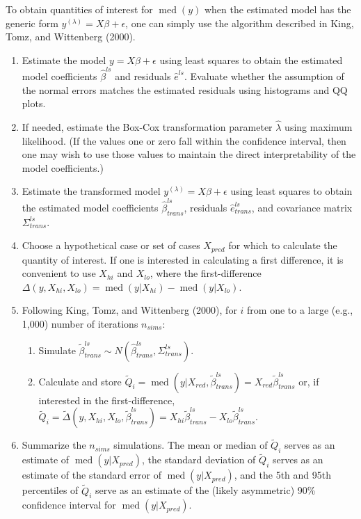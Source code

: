 \documentclass[10pt]{article}
\DeclareMathOperator{\med}{med}
\begin{document}
To obtain quantities of interest for $\med(y)$ when the estimated model has the generic form $y^{(\lambda)} = X\beta + \epsilon$, one can simply use the algorithm described in King, Tomz, and Wittenberg (2000).
\begin{enumerate}
\item Estimate the model $y = X\beta + \epsilon$ using least squares to obtain the estimated model coefficients $\hat{\beta}^{ls}$ and residuals $\hat{e}^{ls}$. Evaluate whether the assumption of the normal errors matches the estimated residuals using histograms and QQ plots.
\item If needed, estimate the Box-Cox transformation parameter $\hat{\lambda}$ using maximum likelihood. (If the values one or zero fall within the confidence interval, then one may wish to use those values to maintain the direct interpretability of the model coefficients.)
\item Estimate the transformed model $y^{(\lambda)} = X\beta + \epsilon$ using least squares to obtain the estimated model coefficients $\hat{\beta}^{ls}_{trans}$, residuals $\hat{e}^{ls}_{trans}$, and covariance matrix $\Sigma^{ls}_{trans}$.
\item Choose a hypothetical case or set of cases $X_{pred}$ for which to calculate the quantity of interest. If one is interested in calculating a first difference, it is convenient to use $X_{hi}$ and $X_{lo}$, where the first-difference $\Delta(y, X_{hi}, X_{lo}) = \med(y | X_{hi}) - \med(y | X_{lo})$.
\item Following King, Tomz, and Wittenberg (2000), for $i$ from one to a large (e.g., 1,000) number of iterations $n_{sims}$:
	\begin{enumerate}
	\item Simulate $\tilde{\beta}^{ls}_{trans} \sim N\left(\hat{\beta}^{ls}_{trans}, \Sigma^{ls}_{trans}\right)$.
	\item Calculate and store $\tilde{Q}_i = \med(y | X_{red}, \tilde{\beta}^{ls}_{trans}) = X_{red}\tilde{\beta}^{ls}_{trans}$ or, if interested in the first-difference, $\tilde{Q}_i = \tilde{\Delta}(y, X_{hi}, X_{lo}, \tilde{\beta}^{ls}_{trans}) = X_{hi}\tilde{\beta}^{ls}_{trans} - X_{lo}\tilde{\beta}^{ls}_{trans}$.
	\end{enumerate}
\item Summarize the $n_{sims}$ simulations. The mean or median of $\tilde{Q}_i$ serves as an estimate of $\med(y | X_{pred})$, the standard deviation of $\tilde{Q}_i$ serves as an estimate of the standard error of $\med(y | X_{pred})$, and the 5th and 95th percentiles of $\tilde{Q}_i$ serve as an estimate of the (likely asymmetric) 90\% confidence interval for $\med(y | X_{pred})$.
\end{enumerate}
\end{document}
